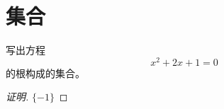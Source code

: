 \chapter{集合}
\begin{Ex}[课本第8页第3题]
  \mbox{} \par \noindent
  
写出方程
\begin{equation*}
x^2+2x+1=0
\end{equation*}
的根构成的集合。
\end{Ex}
\begin{proof}[证明]
$\{-1\}$
\end{proof}
